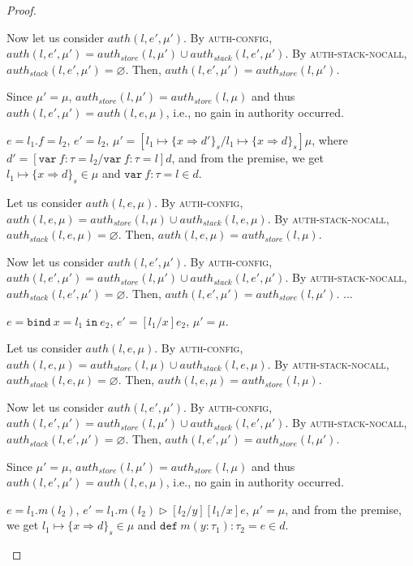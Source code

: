 \documentclass{llncs}
\newcommand{\keywadj}[1]{\mathtt{#1}}
\newcommand{\keyw}[1]{\keywadj{#1}~}
\newcommand{\pcase}[1][]{
  \if\relax\detokenize{#1}\relax
    \def\thiscase{}
  \else
    \def\thiscase{~#1}
  \fi
  \item
}
\begin{document}
\begin{proof}
\begin{pcases}
\hspace{12pt} Now let us consider $auth(l, e', \mu')$. By \textsc{auth-config}, $auth(l, e', \mu') = auth_{store}(l, \mu') \cup auth_{stack}(l, e',\mu')$. By \textsc{auth-stack-nocall}, $auth_{stack}(l, e', \mu') = \varnothing$. Then, $auth(l, e', \mu') = auth_{store}(l, \mu')$.

\hspace{12pt} Since $\mu' = \mu$, $auth_{store}(l, \mu') = auth_{store}(l, \mu)$ and thus $auth(l, e', \mu') = auth(l, e, \mu)$, i.e., no gain in authority occurred.
\\
\pcase[\textsc{E-Assign}]
$e = l_1.f = l_2$, $e' = l_2$, $\mu' = [l_1 \mapsto \{ x \Rightarrow d' \}_{s}/l_1 \mapsto \{ x \Rightarrow d \}_{s}]\mu$, where $d' = [\keyw{var} f:\tau = l_2/\keyw{var} f:\tau = l]d$, and from the premise, we get $l_1 \mapsto \{ x \Rightarrow d \}_{s} \in \mu$ and $\keyw{var} f:\tau = l \in d$.

\hspace{12pt} Let us consider $auth(l, e, \mu)$. By \textsc{auth-config}, $auth(l, e, \mu) = auth_{store}(l, \mu) \cup auth_{stack}(l,e,\mu)$. By \textsc{auth-stack-nocall}, $auth_{stack}(l, e, \mu) = \varnothing$. Then, $auth(l, e, \mu) = auth_{store}(l, \mu)$.

\hspace{12pt} Now let us consider $auth(l, e', \mu')$. By \textsc{auth-config}, $auth(l, e', \mu') = auth_{store}(l, \mu') \cup auth_{stack}(l, e',\mu')$. By \textsc{auth-stack-nocall}, $auth_{stack}(l, e', \mu') = \varnothing$. Then, $auth(l, e', \mu') = auth_{store}(l, \mu')$.
...
\\
\pcase[\textsc{E-Bind}]
$e = \keyw{bind} x = l_1~\keyw{in} e_2$, $e' = [l_1/x]e_2$, $\mu' = \mu$.

\hspace{12pt} Let us consider $auth(l, e, \mu)$. By \textsc{auth-config}, $auth(l, e, \mu) = auth_{store}(l, \mu) \cup auth_{stack}(l,e,\mu)$. By \textsc{auth-stack-nocall}, $auth_{stack}(l, e, \mu) = \varnothing$. Then, $auth(l, e, \mu) = auth_{store}(l, \mu)$.

\hspace{12pt} Now let us consider $auth(l, e', \mu')$. By \textsc{auth-config}, $auth(l, e', \mu') = auth_{store}(l, \mu') \cup auth_{stack}(l, e',\mu')$. By \textsc{auth-stack-nocall}, $auth_{stack}(l, e', \mu') = \varnothing$. Then, $auth(l, e', \mu') = auth_{store}(l, \mu')$.

\hspace{12pt} Since $\mu' = \mu$, $auth_{store}(l, \mu') = auth_{store}(l, \mu)$ and thus $auth(l, e', \mu') = auth(l, e, \mu)$, i.e., no gain in authority occurred.
\\
\pcase[\textsc{E-Meth}]
$e = l_1.m(l_2)$, $e' = l_1.m(l_2) \rhd [l_2/y][l_1/x]e$, $\mu' = \mu$, and from the premise, we get $l_1 \mapsto \{ x \Rightarrow d \}_{s} \in \mu$ and $\keyw{def} m(y : \tau_1) : \tau_2 = e \in d$.


\end{pcases}
\end{proof}
\end{document}
